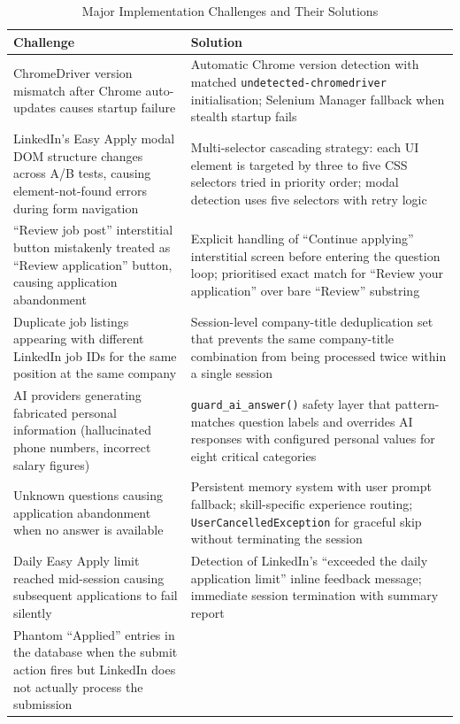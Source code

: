 \documentclass[12pt, a4paper, oneside]{report}
\begin{document}
\begin{table}[H]
\centering
\caption{Major Implementation Challenges and Their Solutions}
\label{tab:challenges}
\begin{tabularx}{\textwidth}{|X|X|}
\hline
\textbf{Challenge} & \textbf{Solution} \\
\hline
ChromeDriver version mismatch after Chrome auto-updates causes startup failure
& Automatic Chrome version detection with matched \texttt{undetected-chromedriver} initialisation; Selenium Manager fallback when stealth startup fails \\
\hline
LinkedIn's Easy Apply modal DOM structure changes across A/B tests, causing element-not-found errors during form navigation
& Multi-selector cascading strategy: each UI element is targeted by three to five CSS selectors tried in priority order; modal detection uses five selectors with retry logic \\
\hline
``Review job post'' interstitial button mistakenly treated as ``Review application'' button, causing application abandonment
& Explicit handling of ``Continue applying'' interstitial screen before entering the question loop; prioritised exact match for ``Review your application'' over bare ``Review'' substring \\
\hline
Duplicate job listings appearing with different LinkedIn job IDs for the same position at the same company
& Session-level company-title deduplication set that prevents the same company-title combination from being processed twice within a single session \\
\hline
AI providers generating fabricated personal information (hallucinated phone numbers, incorrect salary figures)
& \texttt{guard\_ai\_answer()} safety layer that pattern-matches question labels and overrides AI responses with configured personal values for eight critical categories \\
\hline
Unknown questions causing application abandonment when no answer is available
& Persistent memory system with user prompt fallback; skill-specific experience routing; \texttt{UserCancelledException} for graceful skip without terminating the session \\
\hline
Daily Easy Apply limit reached mid-session causing subsequent applications to fail silently
& Detection of LinkedIn's ``exceeded the daily application limit'' inline feedback message; immediate session termination with summary report \\
\hline
Phantom ``Applied'' entries in the database when the submit action fires but LinkedIn does not actually process the submission

\end{tabularx}
\end{table}
\end{document}
